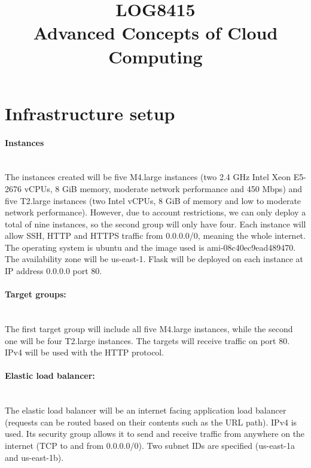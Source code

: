 \documentclass[11pt]{article}
\title{LOG8415\\Advanced Concepts of Cloud Computing}
\author{}
\date{}
\begin{document}
\maketitle

\section{Infrastructure setup}

\paragraph{Instances}\mbox{}\\
The instances created will be five M4.large instances (two 2.4 GHz Intel Xeon E5-2676 vCPUs, 8 GiB memory, moderate network performance and 450 Mbps) and five T2.large instances (two Intel vCPUs, 8 GiB of memory and low to moderate network performance). However, due to account restrictions, we can only deploy a total of nine instances, so the second group will only have four. Each instance will allow SSH, HTTP and HTTPS traffic from 0.0.0.0/0, meaning the whole internet. The operating system is ubuntu and the image used is ami-08c40ec9ead489470. The availability zone will be us-east-1. Flask will be deployed on each instance at IP address 0.0.0.0 port 80.

\paragraph{Target groups:}\mbox{}\\
The first target group will include all five M4.large instances, while the second one will be four T2.large instances. The targets will receive traffic on port 80. IPv4 will be used with the HTTP protocol.

\paragraph{Elastic load balancer:}\mbox{}\\
The elastic load balancer will be an internet facing application load balancer (requests can be routed based on their contents such as the URL path). IPv4 is used. Its security group allows it to send and receive traffic from anywhere on the internet (TCP to and from 0.0.0.0/0). Two subnet IDs are specified (us-east-1a and us-east-1b).
\end{document}
